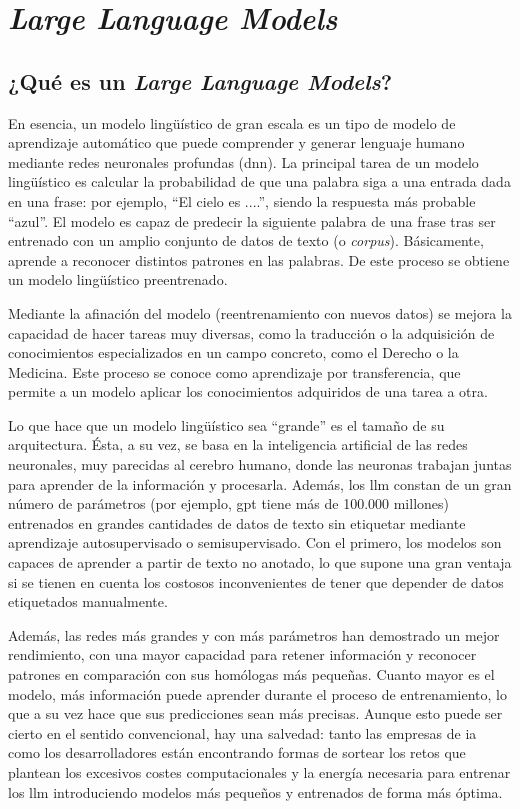 \section{\textit{Large Language Models}}

\subsection{¿Qué es un \textit{Large Language Models}?}

En esencia, un modelo lingüístico de gran escala es un tipo de modelo de aprendizaje automático que puede comprender y generar lenguaje humano mediante redes neuronales profundas (\acrlong{dnn}). La principal tarea de un modelo lingüístico es calcular la probabilidad de que una palabra siga a una entrada dada en una frase: por ejemplo, ``El cielo es ....'', siendo la respuesta más probable ``azul''. El modelo es capaz de predecir la siguiente palabra de una frase tras ser entrenado con un amplio conjunto de datos de texto (o \textit{corpus}). Básicamente, aprende a reconocer distintos patrones en las palabras. De este proceso se obtiene un modelo lingüístico preentrenado.

Mediante la afinación del modelo (reentrenamiento con nuevos datos) se mejora la capacidad de hacer tareas muy diversas, como la traducción o la adquisición de conocimientos especializados en un campo concreto, como el Derecho o la Medicina. Este proceso se conoce como aprendizaje por transferencia, que permite a un modelo aplicar los conocimientos adquiridos de una tarea a otra.

Lo que hace que un modelo lingüístico sea ``grande'' es el tamaño de su arquitectura. Ésta, a su vez, se basa en la inteligencia artificial de las redes neuronales, muy parecidas al cerebro humano, donde las neuronas trabajan juntas para aprender de la información y procesarla. Además, los \acrshort{llm} constan de un gran número de parámetros (por ejemplo, \acrshort{gpt} tiene más de 100.000 millones) entrenados en grandes cantidades de datos de texto sin etiquetar mediante aprendizaje autosupervisado o semisupervisado. Con el primero, los modelos son capaces de aprender a partir de texto no anotado, lo que supone una gran ventaja si se tienen en cuenta los costosos inconvenientes de tener que depender de datos etiquetados manualmente.

Además, las redes más grandes y con más parámetros han demostrado un mejor rendimiento, con una mayor capacidad para retener información y reconocer patrones en comparación con sus homólogas más pequeñas. Cuanto mayor es el modelo, más información puede aprender durante el proceso de entrenamiento, lo que a su vez hace que sus predicciones sean más precisas. Aunque esto puede ser cierto en el sentido convencional, hay una salvedad: tanto las empresas de \acrshort{ia} como los desarrolladores están encontrando formas de sortear los retos que plantean los excesivos costes computacionales y la energía necesaria para entrenar los \acrshort{llm} introduciendo modelos más pequeños y entrenados de forma más óptima.

